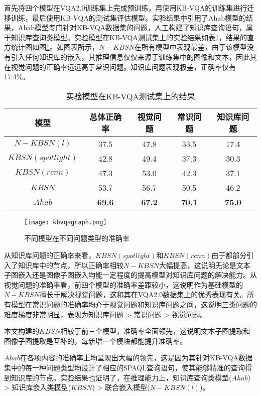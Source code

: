 首先将四个模型在VQA2.0训练集上完成预训练，再使用KB-VQA的训练集进行迁移训练，最后使用KB-VQA的测试集评估模型。实验结果中引用了Ahab模型的结果，Ahab模型专门针对KB-VQA数据集的问题，人工构建了知识库查询语句，属于知识库查询类模型。实验模型在KB-VQA测试集上的实验结果如表\ref{kbvqares}，结果的直方统计图如图\ref{kbvqagraph}。如图表所示，$N-KBSN$在所有模型中表现最差，由于该模型没有引入任何知识库的嵌入，其推理信息仅仅来源于训练集中的图像和文本，因此其在视觉问题的正确率远远高于常识问题。知识库问题表现极差，正确率仅有17.4\%。
\begin{table}[H]
\centering
\caption{实验模型在KB-VQA测试集上的结果}
\begin{tabular}{ccccc}
\toprule
模型 & 总体正确率 & 视觉问题 & 常识问题 & 知识库问题\\
\midrule
$N-KBSN(l)$& 37.5 & 47.8 & 33.5 & 17.4\\
\midrule
$KBSN(spotlight)$&  42.8& 49.4&  37.3& 30.3\\
$KBSN(rcnn)$&  47.3& 53.0&  42.3& 37.1\\
$KBSN$&  53.7& 56.7&  50.5& 46.2\\
\midrule
$Ahab$&  \textbf{69.6}& \textbf{67.2}&  \textbf{70.1}& \textbf{75.0}\\
\bottomrule
\end{tabular}
\label{kbvqares}
\end{table}

\begin{figure}[H]
	\centering
	\texttt{[image: kbvqagraph.png]}
	\caption{不同模型在不同问题类型的准确率}
	\label{kbvqagraph}
\end{figure}

从知识库问题的正确率来看，$KBSN(spotlight)$和$KBSN(rcnn)$由于都部分引入了知识库中的节点，所以正确率相较$N-KBSN$大幅提高，这说明无论是文本子图嵌入还是图像子图嵌入均能一定程度的提高模型对知识库问题的解决能力。从视觉问题的准确率看，前四个模型的准确率差距较小，这说明作为基础模型的$N-KBSN$擅长于解决视觉问题，这和其在VQA2.0数据集上的优秀表现有关。所有模型在常识问题的准确率均介于视觉问题和知识库问题之间，这说明三类问题的难度梯度非常明显，表现为知识库问题 > 常识问题 > 视觉问题。

本文构建的$KBSN$相较于前三个模型，准确率全面领先，这说明文本子图提取和图像子图提取是互补的，每新增一个模块都能提升准确率。

$Ahab$在各项内容的准确率上均呈现出大幅的领先，这是因为其针对KB-VQA数据集中的每一种问题类型均设计了相应的SPAQL查询语句，使其能够精准的查询得到知识库的节点。实验结果也证明了，在推理能力上，知识库查询类模型($Ahab$) > 知识库嵌入类模型($KBSN$) > 联合嵌入模型($N-KBSN(l)$)。


